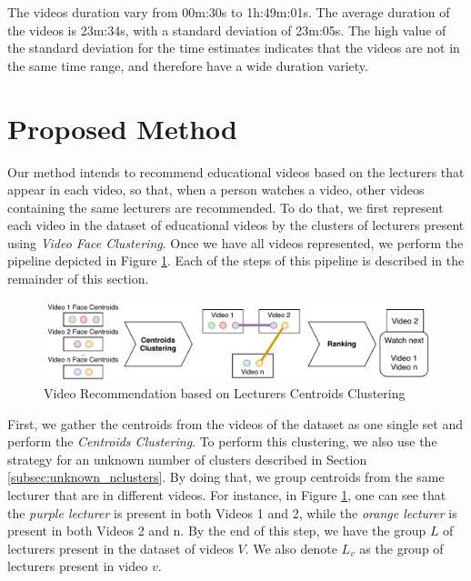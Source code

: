 The videos duration vary from 00m:30s to 1h:49m:01s. 
The average duration of the videos is 23m:34s, with a standard deviation of 23m:05s. 
The high value of the standard deviation for the time estimates indicates that the videos are not in the same time range, and therefore have a wide duration variety. 

\section{Proposed Method}
\label{sec:recommendation_method}

Our method intends to recommend educational videos based on the lecturers that appear in each video, so that, when a person watches a video, other videos containing the same lecturers are recommended.
To do that, we first represent each video in the dataset of educational videos by the clusters of lecturers present using \emph{Video Face Clustering}. Once we have all videos represented, we perform the pipeline depicted in Figure \ref{fig:video_recommendation}. Each of the steps of this pipeline is described in the remainder of this section.

\begin{figure}[!ht]
  \centering
  \includegraphics[width=1\textwidth]{img/video_recommendation/video_recommendation.pdf}
  \caption{Video Recommendation based on Lecturers Centroids Clustering}
  \label{fig:video_recommendation}
\end{figure}

First, we gather the centroids from the videos of the dataset as one single set and perform the \textit{Centroids Clustering}.
To perform this clustering, we also use the strategy for an unknown number of clusters described in Section \ref{subsec:unknown_nclusters}. 
By doing that, we group centroids from the same lecturer that are in different videos. For instance, in Figure \ref{fig:video_recommendation}, one can see that the \emph{purple lecturer} is present in both Videos 1 and 2, while the \emph{orange lecturer} is present in both Videos 2 and n. By the end of this step, we have the group $L$ of lecturers present in the dataset of videos $V$. We also denote $L_v$ as the group of lecturers present in video $v$.

